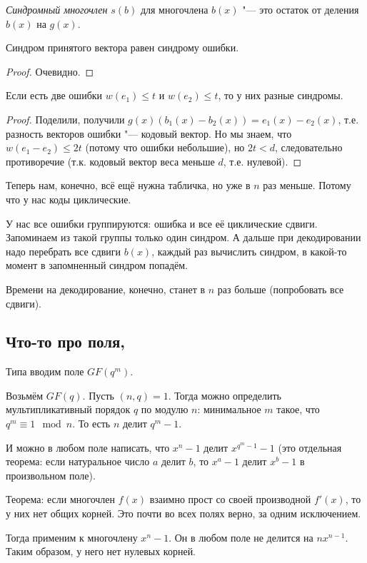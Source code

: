 \begin{Def}
	\textit{Синдромный многочлен} $s(b)$ для многочлена $b(x)$ "---
	это остаток от деления $b(x)$ на $g(x)$.
\end{Def}
\begin{lemma}
	Синдром принятого вектора равен синдрому ошибки.
\end{lemma}
\begin{proof}
	Очевидно.
\end{proof}

\begin{theorem}
	Если есть две ошибки $w(e_1)\le t$ и $w(e_2) \le t$,
	то у них разные синдромы.
\end{theorem}
\begin{proof}
	Поделили, получили $g(x)(b_1(x)-b_2(x))=e_1(x)-e_2(x)$, т.е.
	разность векторов ошибки "--- кодовый вектор.
	Но мы знаем, что $w(e_1-e_2)\le 2t$ (потому что ошибки небольшие),
	но $2t < d$, следовательно противоречие (т.к. кодовый вектор веса
	меньше $d$, т.е. нулевой).
\end{proof}

\begin{Rem}
Теперь нам, конечно, всё ещё нужна табличка, но уже в $n$ раз меньше.
Потому что у нас коды циклические.

У нас все ошибки группируются: ошибка и все её циклические сдвиги.
Запоминаем из такой группы только один синдром.
А дальше при декодировании надо перебрать все сдвиги $b(x)$,
каждый раз вычислить синдром, в какой-то момент в запомненный синдром попадём.

Времени на декодирование, конечно, станет в $n$ раз больше
(попробовать все сдвиги).
\end{Rem}

\subsection{Что-то про поля, \TODO}
Типа вводим поле $GF(q^m)$.

Возьмём $GF(q)$.
Пусть $(n,q)=1$.
Тогда можно определить мультипликативный порядок $q$ по модулю $n$:
минимальное $m$ такое, что $q^m \equiv 1 \mod n$.
То есть $n$ делит $q^m-1$.

И можно в любом поле написать, что $x^n-1$ делит $x^{q^m-1}-1$
(это отдельная теорема: если натуральное число $a$
делит $b$, то $x^a-1$ делит $x^b-1$ в произвольном поле).

Теорема: если многочлен $f(x)$ взаимно прост со своей производной
$f'(x)$, то у них нет общих корней.
Это почти во всех полях верно, за одним исключением.

Тогда применим к многочлену $x^n-1$.
Он в любом поле не делится на $nx^{n-1}$.
Таким образом, у него нет нулевых корней.
